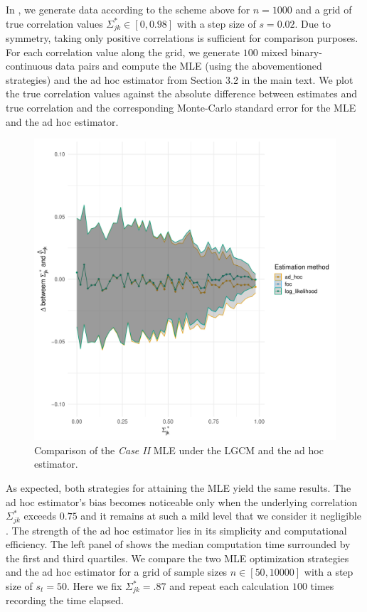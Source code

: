 In , we generate data according to the scheme above for \(n=1000\) and a grid of true correlation values \(\Sigma^*_{jk} \in [0, 0.98]\) with a step size of \(s=0.02\). Due to symmetry, taking only positive correlations is sufficient for comparison purposes. For each correlation value along the grid, we generate \(100\) mixed binary-continuous data pairs and compute the MLE (using the abovementioned strategies) and the ad hoc estimator from Section 3.2 in the main text. We plot the true correlation values against the absolute difference between estimates and true correlation and the corresponding Monte-Carlo standard error for the MLE and the ad hoc estimator.

\begin{figure}\label{fig:case2_comparison}
    \includegraphics[width=\textwidth]{Figures/case_2_difference.pdf}
    \caption{Comparison of the \textit{Case II} MLE under the LGCM and the ad hoc estimator.}
\end{figure}

As expected, both strategies for attaining the MLE yield the same results. The ad hoc estimator's bias becomes noticeable only when the underlying correlation \(\Sigma^*_{jk}\) exceeds \(0.75\) and it remains at such a mild level that we consider it negligible \citep[see][for a similar observation]{Olsson82}. The strength of the ad hoc estimator lies in its simplicity and computational efficiency. The left panel of  shows the median computation time surrounded by the first and third quartiles. We compare the two MLE optimization strategies and the ad hoc estimator for a grid of sample sizes \(n \in [50, 10000]\) with a step size of \(s_t = 50\). Here we fix \(\Sigma^*_{jk} = .87\) and repeat each calculation \(100\) times recording the time elapsed.


